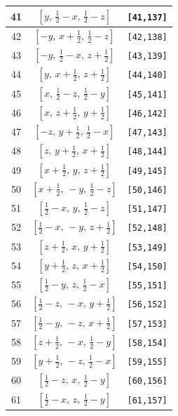 \documentclass[fleqn,8pt]{jsarticle}
\begin{document}
\begin{longtable}{ccc}
41 & $\left[ y,\, \frac{1}{2} - x,\, \frac{1}{2} - z \right]$ & {\tt [41,137]} \\ \hline
42 & $\left[ - y,\, x + \frac{1}{2},\, \frac{1}{2} - z \right]$ & {\tt [42,138]} \\ \hline
43 & $\left[ - y,\, \frac{1}{2} - x,\, z + \frac{1}{2} \right]$ & {\tt [43,139]} \\ \hline
44 & $\left[ y,\, x + \frac{1}{2},\, z + \frac{1}{2} \right]$ & {\tt [44,140]} \\ \hline
45 & $\left[ x,\, \frac{1}{2} - z,\, \frac{1}{2} - y \right]$ & {\tt [45,141]} \\ \hline
46 & $\left[ x,\, z + \frac{1}{2},\, y + \frac{1}{2} \right]$ & {\tt [46,142]} \\ \hline
47 & $\left[ - z,\, y + \frac{1}{2},\, \frac{1}{2} - x \right]$ & {\tt [47,143]} \\ \hline
48 & $\left[ z,\, y + \frac{1}{2},\, x + \frac{1}{2} \right]$ & {\tt [48,144]} \\ \hline
49 & $\left[ x + \frac{1}{2},\, y,\, z + \frac{1}{2} \right]$ & {\tt [49,145]} \\ \hline
50 & $\left[ x + \frac{1}{2},\, - y,\, \frac{1}{2} - z \right]$ & {\tt [50,146]} \\ \hline
51 & $\left[ \frac{1}{2} - x,\, y,\, \frac{1}{2} - z \right]$ & {\tt [51,147]} \\ \hline
52 & $\left[ \frac{1}{2} - x,\, - y,\, z + \frac{1}{2} \right]$ & {\tt [52,148]} \\ \hline
53 & $\left[ z + \frac{1}{2},\, x,\, y + \frac{1}{2} \right]$ & {\tt [53,149]} \\ \hline
54 & $\left[ y + \frac{1}{2},\, z,\, x + \frac{1}{2} \right]$ & {\tt [54,150]} \\ \hline
55 & $\left[ \frac{1}{2} - y,\, z,\, \frac{1}{2} - x \right]$ & {\tt [55,151]} \\ \hline
56 & $\left[ \frac{1}{2} - z,\, - x,\, y + \frac{1}{2} \right]$ & {\tt [56,152]} \\ \hline
57 & $\left[ \frac{1}{2} - y,\, - z,\, x + \frac{1}{2} \right]$ & {\tt [57,153]} \\ \hline
58 & $\left[ z + \frac{1}{2},\, - x,\, \frac{1}{2} - y \right]$ & {\tt [58,154]} \\ \hline
59 & $\left[ y + \frac{1}{2},\, - z,\, \frac{1}{2} - x \right]$ & {\tt [59,155]} \\ \hline
60 & $\left[ \frac{1}{2} - z,\, x,\, \frac{1}{2} - y \right]$ & {\tt [60,156]} \\ \hline
61 & $\left[ \frac{1}{2} - x,\, z,\, \frac{1}{2} - y \right]$ & {\tt [61,157]} \\ \hline

\end{longtable}
\end{document}
